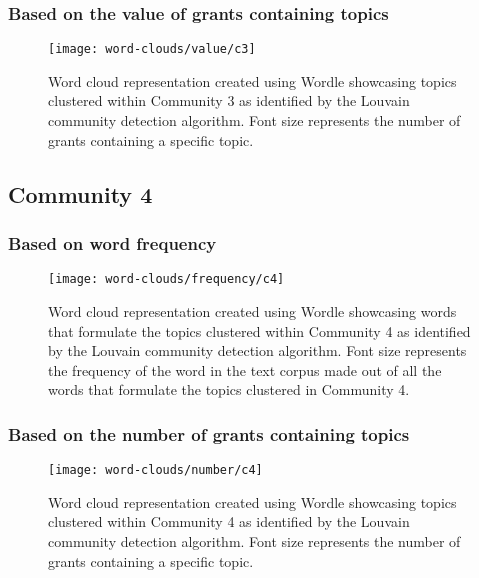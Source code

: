 \subsubsection{Based on the value of grants containing topics}

\begin{figure}[htbp]
    \centering
    \texttt{[image: word-clouds/value/c3]}
    \caption[Word cloud representation based on the value of grants containing topics clustered within Community 3]{Word cloud representation created using Wordle showcasing topics clustered within Community 3 as identified by the Louvain community detection algorithm. Font size represents the number of grants containing a specific topic.}
    \label{fig:topic_grant_value_c3}
\end{figure}

\clearpage

\subsection{Community 4}

\subsubsection{Based on word frequency}

\begin{figure}[htbp]
    \centering
    \texttt{[image: word-clouds/frequency/c4]}
    \caption[Word cloud representation based on word frequency showcasing words that formulate the topics clustered within Community 4]{Word cloud representation created using Wordle showcasing words that formulate the topics clustered within Community 4 as identified by the Louvain community detection algorithm. Font size represents the frequency of the word in the text corpus made out of all the words that formulate the topics clustered in Community 4.}
    \label{fig:topic_grant_freq_c4}
\end{figure}

\subsubsection{Based on the number of grants containing topics}

\begin{figure}[htbp]
    \centering
    \texttt{[image: word-clouds/number/c4]}
    \caption[Word cloud representation based on the number of grants containing topics clustered within Community 4]{Word cloud representation created using Wordle showcasing topics clustered within Community 4 as identified by the Louvain community detection algorithm. Font size represents the number of grants containing a specific topic.}
    \label{fig:topic_grant_number_c4}
\end{figure}

